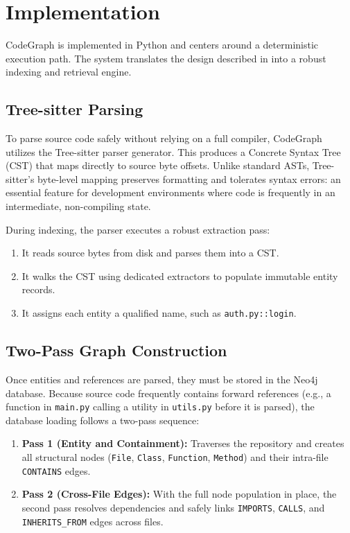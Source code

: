 \section{Implementation}
\label{sec:implementation}

CodeGraph is implemented in Python and centers around a deterministic execution path. The system translates the design described in  into a robust indexing and retrieval engine.

\subsection{Tree-sitter Parsing}

To parse source code safely without relying on a full compiler, CodeGraph utilizes the Tree-sitter parser generator. This produces a Concrete Syntax Tree (CST) that maps directly to source byte offsets. Unlike standard ASTs, Tree-sitter's byte-level mapping preserves formatting and tolerates syntax errors: an essential feature for development environments where code is frequently in an intermediate, non-compiling state. 

During indexing, the parser executes a robust extraction pass:
\begin{enumerate}
    \item It reads source bytes from disk and parses them into a CST.
    \item It walks the CST using dedicated extractors to populate immutable entity records.
    \item It assigns each entity a qualified name, such as \texttt{auth.py::login}.
\end{enumerate}

\subsection{Two-Pass Graph Construction}

Once entities and references are parsed, they must be stored in the Neo4j database. Because source code frequently contains forward references (e.g., a function in \texttt{main.py} calling a utility in \texttt{utils.py} before it is parsed), the database loading follows a two-pass sequence:
\begin{enumerate}
    \item \textbf{Pass 1 (Entity and Containment):} Traverses the repository and creates all structural nodes (\texttt{File}, \texttt{Class}, \texttt{Function}, \texttt{Method}) and their intra-file \texttt{CONTAINS} edges.
    \item \textbf{Pass 2 (Cross-File Edges):} With the full node population in place, the second pass resolves dependencies and safely links \texttt{IMPORTS}, \texttt{CALLS}, and \texttt{INHERITS\_FROM} edges across files.
\end{enumerate}

